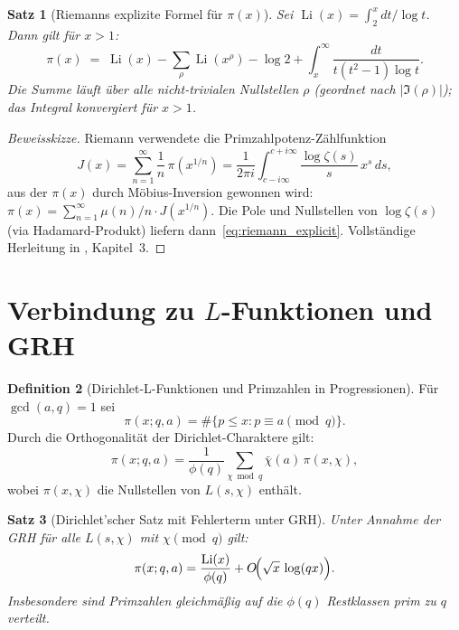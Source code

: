 \documentclass[12pt,a4paper]{amsart}
\newtheorem{theorem}{Satz}[section]
\theoremstyle{definition}
\newtheorem{definition}[theorem]{Definition}
\DeclareMathOperator{\Li}{Li}
\begin{document}
\begin{theorem}[Riemanns explizite Formel f\"ur $\pi(x)$]
\label{thm:riemann_explicit}
Sei $\Li(x) = \int_2^x dt/\log t$. Dann gilt f\"ur $x > 1$:
\begin{equation}
  \label{eq:riemann_explicit}
  \pi(x) \;=\; \Li(x) - \sum_\rho \Li(x^\rho) - \log 2
  + \int_x^{\infty} \frac{dt}{t(t^2-1)\log t}.
\end{equation}
Die Summe l\"auft \"uber alle nicht-trivialen Nullstellen $\rho$ (geordnet
nach $|\Im(\rho)|$); das Integral konvergiert f\"ur $x > 1$.
\end{theorem}

\begin{proof}[Beweisskizze]
Riemann verwendete die \glqq Primzahlpotenz-Z\"ahlfunktion\grqq
\[
  J(x) = \sum_{n=1}^{\infty} \frac{1}{n}\,\pi(x^{1/n})
  = \frac{1}{2\pi i}\int_{c-i\infty}^{c+i\infty} \frac{\log\zeta(s)}{s}\,x^s\,ds,
\]
aus der $\pi(x)$ durch M\"obius-Inversion gewonnen wird:
$\pi(x) = \sum_{n=1}^\infty \mu(n)/n \cdot J(x^{1/n})$.
Die Pole und Nullstellen von $\log\zeta(s)$ (via Hadamard-Produkt)
liefern dann~\eqref{eq:riemann_explicit}.
Vollst\"andige Herleitung in \cite{Titchmarsh1986}, Kapitel~3.
\end{proof}

\section{Verbindung zu \texorpdfstring{$L$}{L}-Funktionen und GRH}

\begin{definition}[Dirichlet-L-Funktionen und Primzahlen in Progressionen]
\label{def:pnt_progressions}
F\"ur $\gcd(a,q) = 1$ sei
\[
  \pi(x; q, a) = \#\{p \le x : p \equiv a \pmod q\}.
\]
Durch die Orthogonalit\"at der Dirichlet-Charaktere gilt:
\[
  \pi(x; q, a) = \frac{1}{\phi(q)}\sum_{\chi \bmod q} \bar\chi(a)\,
  \pi(x, \chi),
\]
wobei $\pi(x,\chi)$ die Nullstellen von $L(s,\chi)$ enth\"alt.
\end{definition}

\begin{theorem}[Dirichlet'scher Satz mit Fehlerterm unter GRH]
\label{thm:dirichlet_grh}
Unter Annahme der GRH f\"ur alle $L(s,\chi)$ mit $\chi \pmod q$ gilt:
\[
  \pi(x; q, a) = \frac{\Li(x)}{\phi(q)}
  + O\!\Bigl(\sqrt{x}\,\log(qx)\Bigr).
\]
Insbesondere sind Primzahlen gleichm\"a\ss ig auf die $\phi(q)$
Restklassen prim zu $q$ verteilt.
\end{theorem}
\end{document}
